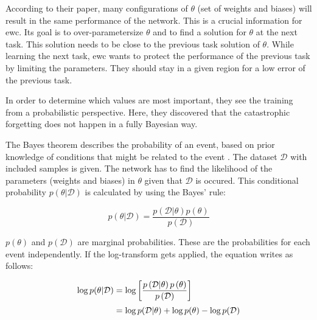 According to their paper, many configurations of $\theta$ (set of weights and biases) will result in the same performance of the network.
This is a crucial information for \acrshort{ewc}.
Its goal is to over-parametersize $\theta$ and to find a solution for $\theta$ at the next task.
This solution needs to be close to the previous task solution of $\theta$.
While learning the next task, \acrshort{ewc} wants to protect the performance of the previous task by limiting the parameters.
They should stay in a given region for a low error of the previous task.
\cite{elastic-weight-consolidation}

In order to determine which values are most important, they see the training from a probabilistic perspective.
Here, they discovered that the catastrophic forgetting does not happen in a fully Bayesian way.
\cite{elastic-weight-consolidation}


The Bayes theorem describes the probability of an event, based on prior knowledge of conditions that might be related to the event \cite{Bayes_theorem}. \cite{elastic-weight-consolidation, schaeffer_ewc}
\newline
The dataset $\mathcal{D}$ with included samples is given.
The network has to find the likelihood of the parameters (weights and biases) in $\theta$ given that $\mathcal{D}$ is occured.
This conditional probability $p \left(\theta | \mathcal{D} \right)$ is calculated by using the Bayes' rule: \cite{elastic-weight-consolidation, schaeffer_ewc}

\begin{equation}
    p \left( \theta | \mathcal{D} \right) = \frac{p \left(\mathcal{D}|\theta\right) p\left(\theta\right)}{p \left( \mathcal{D} \right)}
\end{equation}

$p \left( \theta \right)$ and $p \left( \mathcal{D} \right)$ are marginal probabilities. These are the probabilities for each event independently.
\newline
If the log-transform gets applied, the equation writes as follows: \cite{elastic-weight-consolidation, schaeffer_ewc}

\begin{equation}
    \setlength{\jot}{5pt}
    \begin{split}
        \log p(\theta | \mathcal{D}) & = \log \left[ 
                \frac{p \left(\mathcal{D}|\theta\right) p\left(\theta\right)}{p \left( \mathcal{D} \right)} 
            \right]
        \\
        & = \log p(\mathcal{D} | \theta) + \log p(\theta) - \log p(\mathcal{D})
    \end{split}
    \label{eq:bayes_applied_log}
\end{equation}

